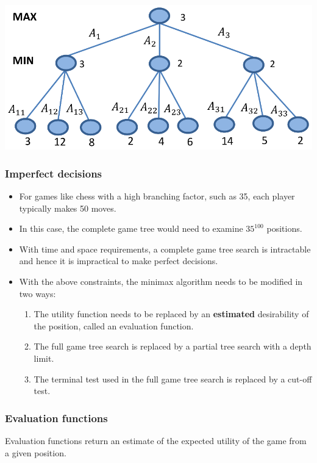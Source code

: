 \documentclass[11pt]{article}
\begin{document}
\begin{center}
\includegraphics[width=.9\linewidth]{./images/minimax-algorithm-perfect-decisions-diagram.png}
\end{center}

 \newpage
\subsubsection{Imperfect decisions}
\label{sec:orgdc758bd}
\begin{itemize}
\item For games like chess with a high branching factor, such as 35, each player typically makes 50 moves.
\item In this case, the complete game tree would need to examine \(35^{100}\) positions.
\item With time and space requirements, a complete game tree search is intractable and hence it is impractical to make perfect decisions.
\item With the above constraints, the minimax algorithm needs to be modified in two ways:
\begin{enumerate}
\item The utility function needs to be replaced by an \textbf{estimated} desirability of the position, called an evaluation function.
\item The full game tree search is replaced by a partial tree search with a depth limit.
\item The terminal test used in the full game tree search is replaced by a cut-off test.
\end{enumerate}
\end{itemize}
\subsubsection{Evaluation functions}
\label{sec:org536038b}
Evaluation functions return an estimate of the expected utility of the game from a given position.
\end{document}
